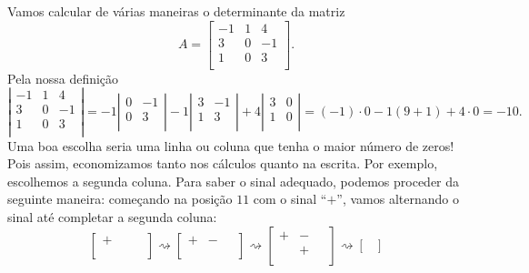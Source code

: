 \documentclass[../livro.tex]{subfiles}  %
\begin{document}
\begin{example}
Vamos calcular de várias maneiras o determinante da matriz
\[
A = 
\begin{bmatrix}
-1 & 1 & 4 \\
 3 & 0 & -1 \\
 1 & 0 & 3 \\
\end{bmatrix}.
\] Pela nossa definição
\[
\left| 
\begin{matrix}
-1 & 1 & 4 \\
3 & 0 & -1 \\
1 & 0 & 3 \\
\end{matrix}
\right| =
-1 \left| 
\begin{matrix}
 0 & -1 \\
 0 & 3 \\
\end{matrix}
\right| - 1 \left| 
\begin{matrix}
3  & -1 \\
1  & 3 \\
\end{matrix}
\right| + 4 
\left| 
\begin{matrix}
3 & 0  \\
1 & 0  \\
\end{matrix}
\right| = (-1)\cdot 0 - 1 (9 + 1) + 4 \cdot 0 = -10.
\] Uma boa escolha seria uma linha ou coluna que tenha o maior número de zeros! Pois assim, economizamos tanto nos cálculos quanto na escrita. Por exemplo, escolhemos a segunda coluna. Para saber o sinal adequado, podemos proceder da seguinte maneira: começando na posição $11$ com o sinal ``$+$'', vamos alternando o sinal até completar a segunda coluna:
\[
\begin{bmatrix}
+ & \,\,  & \,\,  \\
  &  &   \\
  &  &   
\end{bmatrix} \rightsquigarrow 
\begin{bmatrix}
+ & - & \,\,  \\
\,\,& \,\, & \,\,  \\
\,\,& \,\, &  \,\, 
\end{bmatrix}\rightsquigarrow 
\begin{bmatrix}
+ & - & \,\,  \\
& + & \,\,  \\
\,\,& \,\, &  \,\, 
\end{bmatrix} \rightsquigarrow 
\begin{bmatrix}

\end{bmatrix}\]
\end{example}
\end{document}

